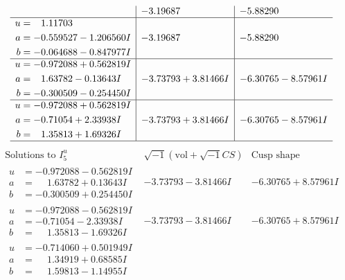 \documentclass[1p]{elsarticle_modified}
\theoremstyle{definition}
\newcommand{\I}{\sqrt{-1}}
\begin{document}
$$\begin{array}{c|c|c}
 & -3.19687\phantom{ +0.000000I} & -5.88290\phantom{ +0.000000I} \\ \hline\begin{aligned}
u &= \phantom{-}1.11703\phantom{ +0.000000I} \\
a &= -0.559527 - 1.206560 I \\
b &= -0.064688 - 0.847977 I\end{aligned}
 & -3.19687\phantom{ +0.000000I} & -5.88290\phantom{ +0.000000I} \\ \hline\begin{aligned}
u &= -0.972088 + 0.562819 I \\
a &= \phantom{-}1.63782 - 0.13643 I \\
b &= -0.300509 - 0.254450 I\end{aligned}
 & -3.73793 + 3.81466 I & -6.30765 - 8.57961 I \\ \hline\begin{aligned}
u &= -0.972088 + 0.562819 I \\
a &= -0.71054 + 2.33938 I \\
b &= \phantom{-}1.35813 + 1.69326 I\end{aligned}
 & -3.73793 + 3.81466 I & -6.30765 - 8.57961 I\\
 \hline 
 \end{array}$$\newpage$$\begin{array}{c|c|c}  
\text{Solutions to }I^u_{5}& \I (\text{vol} + \sqrt{-1}CS) & \text{Cusp shape}\\
 \hline 
\begin{aligned}
u &= -0.972088 - 0.562819 I \\
a &= \phantom{-}1.63782 + 0.13643 I \\
b &= -0.300509 + 0.254450 I\end{aligned}
 & -3.73793 - 3.81466 I & -6.30765 + 8.57961 I \\ \hline\begin{aligned}
u &= -0.972088 - 0.562819 I \\
a &= -0.71054 - 2.33938 I \\
b &= \phantom{-}1.35813 - 1.69326 I\end{aligned}
 & -3.73793 - 3.81466 I & -6.30765 + 8.57961 I \\ \hline\begin{aligned}
u &= -0.714060 + 0.501949 I \\
a &= \phantom{-}1.34919 + 0.68585 I \\
b &= \phantom{-}1.59813 - 1.14955 I\end{aligned}

\end{array}$$
\end{document}
